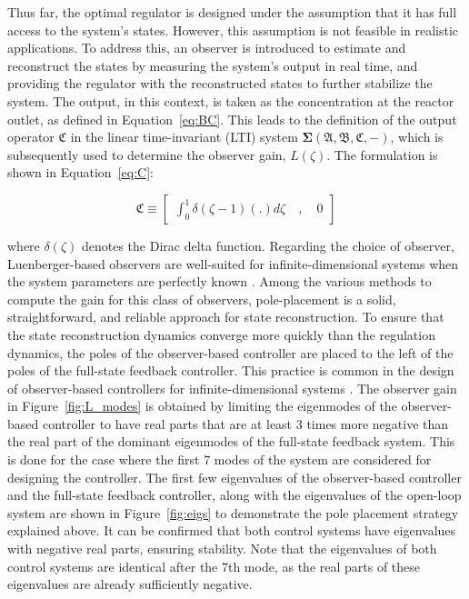 Thus far, the optimal regulator is designed under the assumption that it has full access to the system's states. However, this assumption is not feasible in realistic applications. To address this, an observer is introduced to estimate and reconstruct the states by measuring the system's output in real time, and providing the regulator with the reconstructed states to further stabilize the system. The output, in this context, is taken as the concentration at the reactor outlet, as defined in Equation~\ref{eq:BC}. This leads to the definition of the output operator $\mathfrak{C}$ in the linear time-invariant (LTI) system $\mathbf{\Sigma(\mathfrak{A},\mathfrak{B},\mathfrak{C},-)}$, which is subsequently used to determine the observer gain, $L(\zeta)$. The formulation is shown in Equation~\ref{eq:C}:

\begin{equation} \label{eq:C}
    \mathfrak{C} \equiv \begin{bmatrix}
        \int_0^1 \delta(\zeta-1) (.) d\zeta \quad , \quad 0
    \end{bmatrix}
\end{equation}

where $\delta(\zeta)$ denotes the Dirac delta function. Regarding the choice of observer, Luenberger-based observers are well-suited for infinite-dimensional systems when the system parameters are perfectly known \autocite{ali2015reviewobserver}. Among the various methods to compute the gain for this class of observers, pole-placement is a solid, straightforward, and reliable approach for state reconstruction. To ensure that the state reconstruction dynamics converge more quickly than the regulation dynamics, the poles of the observer-based controller are placed to the left of the poles of the full-state feedback controller. This practice is common in the design of observer-based controllers for infinite-dimensional systems \autocite{morrisbook}. The observer gain in Figure~\ref{fig:L_modes} is obtained by limiting the eigenmodes of the observer-based controller to have real parts that are at least 3 times more negative than the real part of the dominant eigenmodes of the full-state feedback system. This is done for the case where the first 7 modes of the system are considered for designing the controller. The first few eigenvalues of the observer-based controller and the full-state feedback controller, along with the eigenvalues of the open-loop system are shown in Figure~\ref{fig:eigs} to demonstrate the pole placement strategy explained above. It can be confirmed that both control systems have eigenvalues with negative real parts, ensuring stability. Note that the eigenvalues of both control systems are identical after the 7th mode, as the real parts of these eigenvalues are already sufficiently negative.


